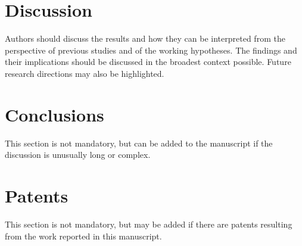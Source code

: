 \documentclass[journal,article,submit,pdftex,moreauthors]{Definitions/mdpi}
\begin{document}
\section{Discussion}

Authors should discuss the results and how they can be interpreted from the perspective of previous studies and of the working hypotheses. The findings and their implications should be discussed in the broadest context possible. Future research directions may also be highlighted.

\section{Conclusions}

This section is not mandatory, but can be added to the manuscript if the discussion is unusually long or complex.

\section{Patents}

This section is not mandatory, but may be added if there are patents resulting from the work reported in this manuscript.

\vspace{6pt} 



\end{document}
